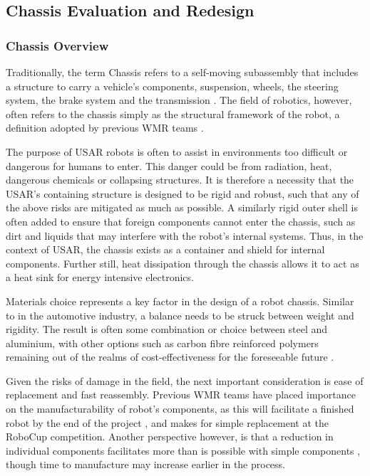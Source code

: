 \subsection{Chassis Evaluation and Redesign}

\subsubsection{Chassis Overview}
Traditionally, the term Chassis refers to a self-moving subassembly that includes a structure to carry a vehicle’s components, suspension, wheels, the steering system, the brake system and the transmission \cite{Gent09}. The field of robotics, however, often refers to the chassis simply as the structural framework of the robot, a definition adopted by previous WMR teams \cite{WMR15}.\par
The purpose of USAR robots is often to assist in environments too difficult or dangerous for humans to enter. This danger could be from radiation, heat, dangerous chemicals or collapsing structures. It is therefore a necessity that the USAR’s containing structure is designed to be rigid and robust, such that any of the above risks are mitigated as much as possible. A similarly rigid outer shell is often added to ensure that foreign components cannot enter the chassis, such as dirt and liquids that may interfere with the robot’s internal systems. Thus, in the context of USAR, the chassis exists as a container and shield for internal components. Further still, heat dissipation through the chassis allows it to act as a heat sink for energy intensive electronics. \par
Materials choice represents a key factor in the design of a robot chassis. Similar to in the automotive industry, a balance needs to be struck between weight and rigidity. The result is often some combination or choice between steel and aluminium, with other options such as carbon fibre reinforced polymers remaining out of the realms of cost-effectiveness for the foreseeable future \cite{Davies12}. \par
Given the risks of damage in the field, the next important consideration is ease of replacement and fast reassembly. Previous WMR teams have placed importance on the manufacturability of robot’s components, as this will facilitate a finished robot by the end of the project \cite{WMR15}, \cite{WMR14} and makes for simple replacement at the RoboCup competition. Another perspective however, is that a reduction in individual components facilitates more than is possible with simple components \cite{Boothroyd10}, though time to manufacture may increase earlier in the process. \par
